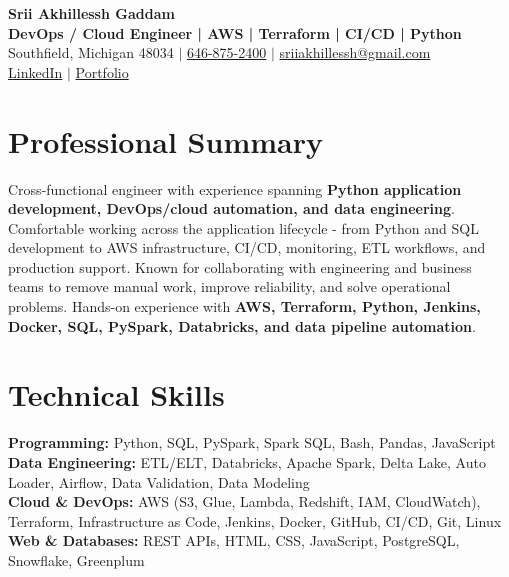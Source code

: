 \documentclass[letterpaper,10pt]{article}
\begin{document}
\fontsize{9.35pt}{10.45pt}\selectfont

\begin{center}
    {\LARGE \textbf{Srii Akhillessh Gaddam}} \\[-1pt]
    \textbf{DevOps / Cloud Engineer | AWS | Terraform | CI/CD | Python} \\[2pt]
    Southfield, Michigan 48034 $|$
    \href{tel:6468752400}{646-875-2400} $|$
    \href{mailto:sriiakhillessh@gmail.com}{sriiakhillessh@gmail.com} \\[1pt]
    \href{https://www.linkedin.com/in/srii-akhiilessh-gaddam-b48668191/}{LinkedIn} $|$
    \href{https://sriiakhillesshg.github.io/portfolio/}{Portfolio}
\end{center}
\vspace{-8pt}

\section{Professional Summary}
\small{Cross-functional engineer with experience spanning \textbf{Python application development, DevOps/cloud automation, and data engineering}. Comfortable working across the application lifecycle - from Python and SQL development to AWS infrastructure, CI/CD, monitoring, ETL workflows, and production support. Known for collaborating with engineering and business teams to remove manual work, improve reliability, and solve operational problems. Hands-on experience with \textbf{AWS, Terraform, Python, Jenkins, Docker, SQL, PySpark, Databricks, and data pipeline automation}.}

\section{Technical Skills}
\small{
\textbf{Programming:} Python, SQL, PySpark, Spark SQL, Bash, Pandas, JavaScript \\
\textbf{Data Engineering:} ETL/ELT, Databricks, Apache Spark, Delta Lake, Auto Loader, Airflow, Data Validation, Data Modeling \\
\textbf{Cloud \& DevOps:} AWS (S3, Glue, Lambda, Redshift, IAM, CloudWatch), Terraform, Infrastructure as Code, Jenkins, Docker, GitHub, CI/CD, Git, Linux \\
\textbf{Web \& Databases:} REST APIs, HTML, CSS, JavaScript, PostgreSQL, Snowflake, Greenplum
}
\end{document}
